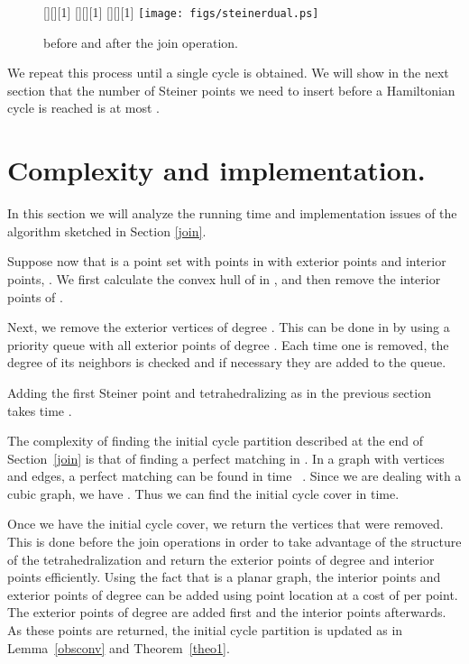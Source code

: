 \documentclass{article}
\begin{document}
\begin{figure} \label{dualsteiner}
  \begin{center}
	[][][1]{}
    [][][1]{}
    [][][1]{}					
	\texttt{[image: figs/steinerdual.ps]}
  \end{center}
    \caption{ before and after the join operation.}
\end{figure}

We repeat this process until a single cycle is obtained.
We will show in the next section that the number of 
Steiner points we need to insert before  a Hamiltonian
cycle is reached is at most . 

 
\section{Complexity and implementation.} \label{alg}

In this section we will analyze the running time and 
implementation issues of the algorithm sketched in Section 
\ref{join}.\par

Suppose now that  is a point set with  points in
 with  exterior points and  interior 
points, .
We first calculate the convex hull of 
 in , and then remove the interior points of .\par


Next, we remove the exterior vertices of degree .
This can be done in  by using a priority queue with
all exterior points of degree . Each time one is removed,
the degree of its neighbors is checked and if necessary they
are added to the queue.\par


Adding the first Steiner point  and tetrahedralizing 
as in the previous section takes time .\par

The complexity of finding the initial cycle partition described
at the end of Section~\ref{join}
is that of finding 
a perfect matching in . In a graph with  vertices and  
edges, a perfect matching can be found  in time 
~\cite{micali}. Since we are dealing
with a cubic graph, we have . Thus we can 
find the initial cycle cover in 
 time.\par

Once we have the initial cycle cover, we return the vertices 
that were removed. This is done before the 
join operations in order to take advantage of the structure
of the tetrahedralization and return the exterior points of
degree  and interior points efficiently.
Using the fact that  is a planar graph, the 
interior points and exterior points of degree  can be 
added using point location at a cost of  per point.
The exterior points
of degree  are added first and the interior points afterwards.
As these points are returned, the initial cycle partition is
updated as in Lemma~\ref{obsconv} and Theorem~\ref{theo1}.\par
\end{document}
